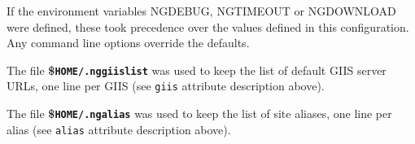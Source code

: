If the environment variables NGDEBUG, NGTIMEOUT or NGDOWNLOAD were
defined, these took precedence over the values defined in this
configuration. Any command line options override the defaults.

The file \textbf{{\$}\texttt{HOME/.nggiislist}} was used to keep the
list of default GIIS server URLs, one line per GIIS (see \texttt{giis}
attribute description above).

The file \textbf{{\$}\texttt{HOME/.ngalias}} was used to keep the
list of site aliases, one line per alias (see \texttt{alias}
attribute description above).
